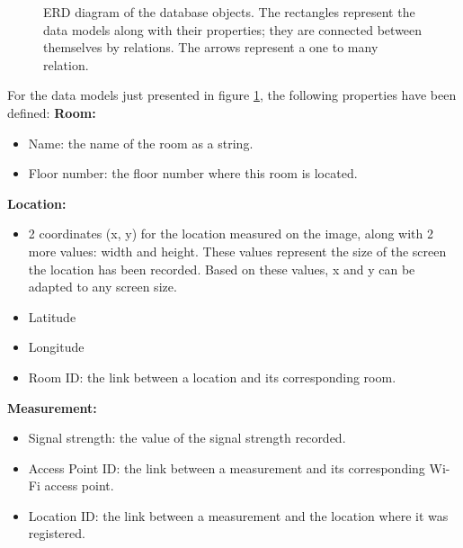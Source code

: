 \begin{figure}[H]
    \centering
    \centering
    \caption{ERD diagram of the database objects. The rectangles represent the data models along with their properties; they are connected between themselves by relations. The arrows represent a one to many relation.}
    \label{fig:erd-diagram}
\end{figure}

For the data models just presented in figure \ref{fig:erd-diagram}, the following properties have been defined:
\noindent\textbf{Room:}
\begin{itemize}
    \item Name: the name of the room as a string.
    \item Floor number: the floor number where this room is located.
\end{itemize}

\noindent\textbf{Location:}
\begin{itemize}
    \item 2 coordinates (x, y) for the location measured on the image, along with 2 more values: width and height. These values represent the size of the screen the location has been recorded. Based on these values, x and y can be adapted to any screen size.
    \item Latitude
    \item Longitude
    \item Room ID: the link between a location and its corresponding room.
\end{itemize}

\noindent\textbf{Measurement:}
\begin{itemize}
    \item Signal strength: the value of the signal strength recorded.
    \item Access Point ID: the link between a measurement and its corresponding Wi-Fi access point.
    \item Location ID: the link between a measurement and the location where it was registered.
\end{itemize}


